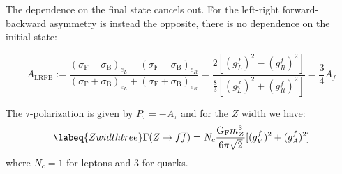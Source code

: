 \documentclass[../main.tex]{subfiles}
\begin{document}
The dependence on the final state cancels out. For the left-right forward-backward asymmetry is instead the opposite, there is no dependence on the initial state:
\begin{kaobox}[frametitle=Left-Right Forward-Backward Asymmetry]
\[
A_{\text{LRFB}}:=\frac{(\sigma_{\text{F}}-\sigma_{\text{B}})_{e_L}-(\sigma_{\text{F}}-\sigma_{\text{B}})_{e_R}}{(\sigma_{\text{F}}+\sigma_{\text{B}})_{e_L}+(\sigma_{\text{F}}+\sigma_{\text{B}})_{e_R}}=\frac{2[(g_L^f)^2-(g_R^f)^2]}{\frac{8}{3}[(g_L^f)^2+(g_R^f)^2]}=\frac{3}{4}A_f
\]
\end{kaobox}
The $\tau$-polarization is given by $P_\tau=-A_\tau$ and for the $Z$ width we have:
\begin{equation}
\labeq{Zwidthtree}
\Gamma(Z\to f\overline{f})=N_c\frac{\text{G}_\text{F}m_Z^3}{6\pi\sqrt{2}}[(g_V^f)^2+(g_A^f)^2]
\end{equation}
where $N_c=1$ for leptons and 3 for quarks.
\end{document}
